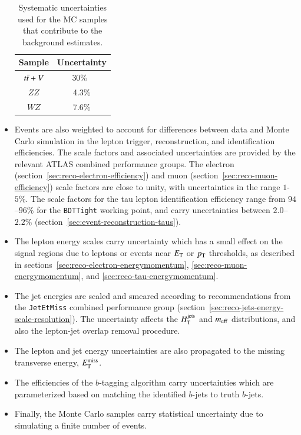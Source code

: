 \begin{itemize}
  \begin{table}
    \begin{center}
      \begin{tabular}{c c}
        \hline
        Sample     &Uncertainty\\
        \hline
        $t\bar{t}+V$ &30\%~\cite{Garzelli:2012gx,Campbell:2012en} \\
        $ZZ$       &4.3\% \\
        $WZ$       &7.6\%\\
        \hline
      \end{tabular}
      \caption{Systematic uncertainties used for the MC samples that contribute to the background estimates.}
      \label{table:model-independent-cross-section-uncertainties}
    \end{center}
  \end{table}

	\item Events are also weighted to account for differences between data and Monte Carlo simulation in the lepton trigger, reconstruction, and identification efficiencies. The scale factors and associated uncertainties are provided by the relevant ATLAS combined performance groups. The electron (section~\ref{sec:reco-electron-efficiency}) and muon (section~\ref{sec:reco-muon-efficiency}) scale factors are close to unity, with uncertainties in the range $1$-$5\%$. The scale factors for the tau lepton identification efficiency range from $94$--$96\%$ for the \texttt{BDTTight} working point, and carry uncertainties between $2.0$--$2.2\%$ (section~\ref{sec:event-reconstruction-taus}).

	\item The lepton energy scales carry uncertainty which has a small effect on the signal regions due to leptons or events near $E_{\mathrm{T}}$ or $p_{\text{T}}$ thresholds, as described in sections~\ref{sec:reco-electron-energymomentum}, \ref{sec:reco-muon-energymomentum}, and \ref{sec:reco-tau-energymomentum}.

	\item  The jet energies are scaled and smeared according to recommendations from the \texttt{JetEtMiss} combined performance group (section~\ref{sec:reco-jets-energy-scale-resolution}). The uncertainty affects the $H_{\mathrm{T}}^{\mathrm{jets}}$ and $m_{\mathrm{eff}}$ distributions, and also the lepton-jet overlap removal procedure.

	\item The lepton and jet energy uncertainties are also propagated to the missing transverse energy, $E_{\text{T}}^{\text{miss}}$. 

	\item The efficiencies of the $b$-tagging algorithm carry uncertainties which are parameterized based on matching the identified $b$-jets to truth $b$-jets.

	\item Finally, the Monte Carlo samples carry statistical uncertainty due to simulating a finite number of events. 
\end{itemize}

